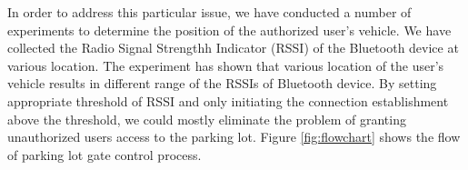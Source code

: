 In order to address this particular issue, we have conducted a number of experiments to determine the position of the authorized user's vehicle. We have collected the Radio Signal Strengthh Indicator (RSSI) of the Bluetooth device at various location. The experiment has shown that various location of the user's vehicle results in different range of the RSSIs of Bluetooth device. By setting appropriate threshold of RSSI and only initiating the connection establishment above the threshold, we could mostly eliminate the problem of granting unauthorized users access to the parking lot. Figure \ref{fig:flowchart} shows the flow of parking lot gate control process.
